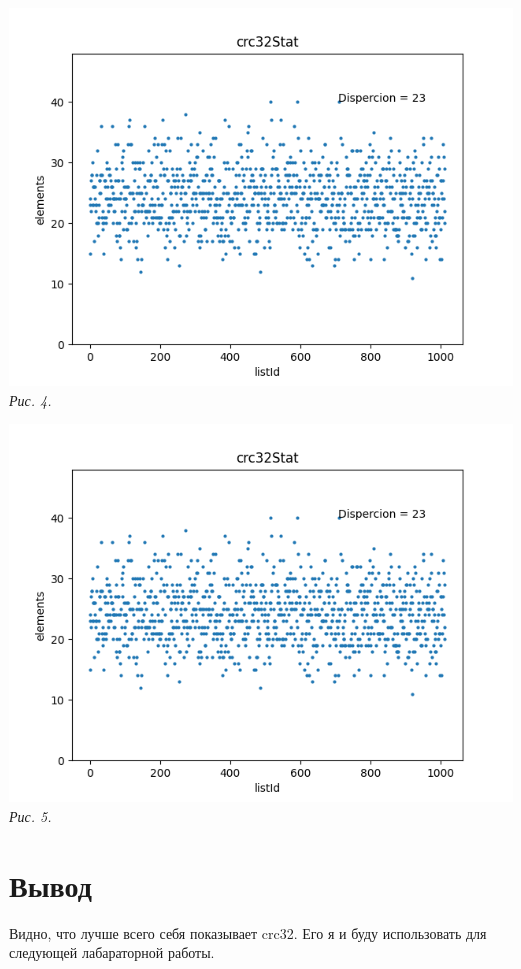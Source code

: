 \noindent\begin{minipage}[h!]{0.45\linewidth}
    \begin{center}
        \includegraphics[width = 1\linewidth]{picks/crc32Stat.png} \\
        \textit{Рис. 4. }
    \end{center} 
\end{minipage}
\begin{minipage}[h!]{0.45\linewidth}
    \begin{center}
        \includegraphics[width = 1\linewidth]{picks/crc32Stat.png} \\
        \textit{Рис. 5. }
    \end{center} 
\end{minipage}

\newpage

\section{ Вывод }

Видно, что лучше всего себя показывает crc32. Его я и буду использовать для следующей лабараторной работы.